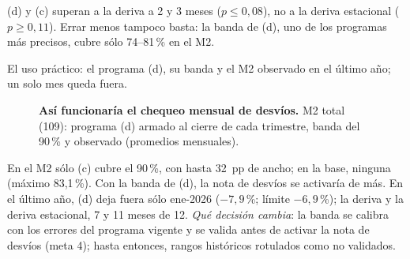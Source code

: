 (d) y (c) superan a la deriva a 2 y 3 meses ($p\leq0{,}08$), no a la deriva estacional ($p\geq0{,}11$). Errar menos tampoco basta: la banda de (d), uno de los programas más precisos, cubre sólo 74--81\,\% en el M2.

 El uso práctico: el programa (d), su banda y el M2 observado en el último año; un solo mes queda fuera.

\begin{figure}[H]\centering
\caption{\textbf{Así funcionaría el chequeo mensual de desvíos.} M2 total (109): programa (d) armado al cierre de cada trimestre, banda del 90\,\% y observado (promedios mensuales).}\label{f:chk}
\end{figure}

 En el M2 sólo (c) cubre el 90\,\%, con hasta 32~pp de ancho; en la base, ninguna (máximo 83,1\,\%). Con la banda de (d), la nota de desvíos se activaría de más. En el último año, (d) deja fuera sólo ene-2026 ($-7{,}9$\,\%; límite $-6{,}9$\,\%); la deriva y la deriva estacional, 7 y 11 meses de 12. \emph{Qué decisión cambia}: la banda se calibra con los errores del programa vigente y se valida antes de activar la nota de desvíos (meta 4); hasta entonces, rangos históricos rotulados como no validados.
